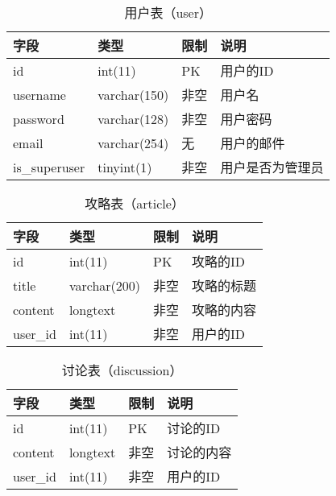             \begin{table}[htbp]
                \caption{\wuhao 用户表（user）}
                \vspace{0.5em}\centering\wuhao
                \begin{tabular}{llll}
                    \toprule[1.5pt]
                    字段 & 类型 & 限制 & 说明\\
                    \midrule[1pt]
                    id & int(11) & PK & 用户的ID\\
                    username & varchar(150) & 非空 & 用户名\\
                    password & varchar(128) & 非空 & 用户密码\\
                    email & varchar(254) & 无 & 用户的邮件\\
                    is\_superuser & tinyint(1) & 非空 & 用户是否为管理员\\ 
                    \bottomrule[1.5pt]
                \end{tabular}
            \end{table}

            \begin{table}[htbp]
                \caption{\wuhao 攻略表（article）}
                \vspace{0.5em}\centering\wuhao
                \begin{tabular}{llll}
                    \toprule[1.5pt]
                    字段 & 类型 & 限制 & 说明\\
                    \midrule[1pt]
                    id & int(11) & PK & 攻略的ID\\
                    title & varchar(200) & 非空 & 攻略的标题\\
                    content & longtext & 非空 & 攻略的内容\\
                    user\_id & int(11) & 非空 & 用户的ID\\
                    \bottomrule[1.5pt]
                \end{tabular}
            \end{table}

            \begin{table}[htbp]
                \caption{\wuhao 讨论表（discussion）}
                \vspace{0.5em}\centering\wuhao
                \begin{tabular}{llll}
                    \toprule[1.5pt]
                    字段 & 类型 & 限制 & 说明\\
                    \midrule[1pt]
                    id & int(11) & PK & 讨论的ID\\
                    content & longtext & 非空 & 讨论的内容\\
                    user\_id & int(11) & 非空 & 用户的ID\\
                    \bottomrule[1.5pt]
                \end{tabular}
            \end{table}

